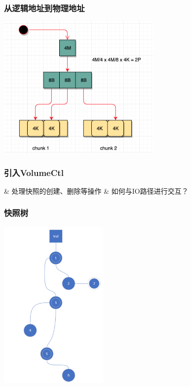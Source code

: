 \documentclass[UTF8,8pt,xcolor=dvipsnames]{beamer}
\newenvironment{myeasylist}[1]{
    \Activate
    \begin{tcolorbox}
    \begin{easylist}[#1]
} {
    \end{easylist}
    \end{tcolorbox}
    \Deactivate
}
\begin{document}
\begin{frame}[fragile]
    \frametitle{从逻辑地址到物理地址}
    \begin{center}
        \includegraphics[width=0.6\textwidth]{../imgs/row-head.png}
    \end{center}
\end{frame}

\begin{frame}[fragile]
    \frametitle{引入VolumeCtl}
    \begin{myeasylist}{itemize}
        & 处理快照的创建、删除等操作
        & 如何与IO路径进行交互？
    \end{myeasylist}
\end{frame}

\begin{frame}[fragile]
    \frametitle{快照树}
    \begin{center}
        \includegraphics[width=0.4\textwidth]{../imgs/snaptree.png}
    \end{center}
\end{frame}
\end{document}
